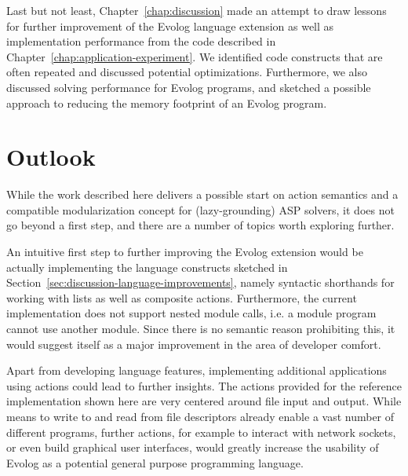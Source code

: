 Last but not least, Chapter~\ref{chap:discussion} made an attempt to draw lessons for further improvement of the Evolog language extension as well as implementation performance from the code described in Chapter~\ref{chap:application-experiment}. We identified code constructs that are often repeated and discussed potential optimizations. Furthermore, we also discussed solving performance for Evolog programs, and sketched a possible approach to reducing the memory footprint of an Evolog program.

\section{Outlook}

While the work described here delivers a possible start on action semantics and a compatible modularization concept for (lazy-grounding) ASP solvers, it does not go beyond a first step, and there are a number of topics worth exploring further.

An intuitive first step to further improving the Evolog extension would be actually implementing the language constructs sketched in Section~\ref{sec:discussion-language-improvements}, namely syntactic shorthands for working with lists as well as composite actions. Furthermore, the current implementation does not support nested module calls, i.e. a module program cannot use another module. Since there is no semantic reason prohibiting this, it would suggest itself as a major improvement in the area of developer comfort.

Apart from developing language features, implementing additional applications using actions could lead to further insights. The actions provided for the reference implementation shown here are very centered around file input and output. While means to write to and read from file descriptors already enable a vast number of different programs, further actions, for example to interact with network sockets, or even build graphical user interfaces, would greatly increase the usability of Evolog as a potential general purpose programming language.